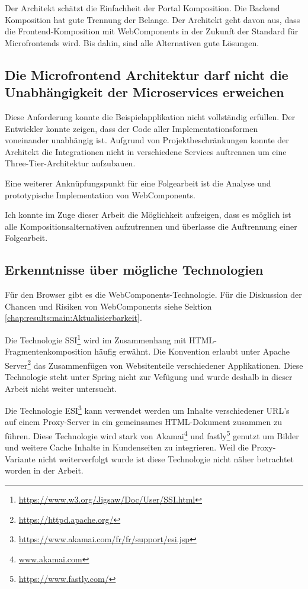 Der Architekt  schätzt die Einfachheit der Portal Komposition. Die Backend Komposition hat gute Trennung der Belange. Der Architekt geht davon aus, dass die Frontend-Komposition mit WebComponents in der Zukunft der Standard für Microfrontends wird. Bis dahin, sind alle Alternativen gute Lösungen.

\subsection{Die Microfrontend Architektur darf nicht die Unabhängigkeit der Microservices erweichen}

Diese  Anforderung konnte die Beispielapplikation nicht vollständig erfüllen. Der Entwickler konnte zeigen, dass der Code aller Implementationsformen voneinander unabhängig ist. Aufgrund von Projektbeschränkungen konnte der Architekt die Integrationen nicht in verschiedene Services auftrennen um eine Three-Tier-Architektur aufzubauen.

Eine  weiterer Anknüpfungspunkt für eine Folgearbeit ist die Analyse und prototypische Implementation von WebComponents. \cite{mdnWebComponents}

Ich  konnte im Zuge dieser Arbeit die Möglichkeit aufzeigen, dass es möglich ist alle Kompositionsalternativen aufzutrennen und überlasse die Auftrennung einer Folgearbeit.

\subsection{Erkenntnisse über mögliche Technologien}

Für den Browser gibt es die  WebComponents-Technologie. \cite{mdnWebComponents} Für die Diskussion der Chancen und Risiken von WebComponents siehe Sektion \ref{chap:results:main:Aktualisierbarkeit}.

Die Technologie  \ac{SSI}\footnote{\url{https://www.w3.org/Jigsaw/Doc/User/SSI.html}} wird im Zusammenhang mit \ac{HTML}-Fragmentenkomposition häufig erwähnt. Die Konvention erlaubt unter Apache Server\footnote{\url{https://httpd.apache.org/}} das Zusammenfügen von Websitenteile verschiedener Applikationen. Diese Technologie steht unter Spring nicht zur Vefügung und wurde deshalb in dieser Arbeit nicht weiter untersucht.

Die Technologie  \ac{ESI}\footnote{\url{https://www.akamai.com/fr/fr/support/esi.jsp}} kann verwendet werden um Inhalte verschiedener URL's auf einem Proxy-Server in ein gemeinsames \ac{HTML}-Dokument zusammen zu führen. Diese Technologie wird stark von Akamai\footnote{\url{www.akamai.com}} und fastly\footnote{\url{https://www.fastly.com/}} genutzt um Bilder und weitere Cache Inhalte in Kundenseiten zu integrieren.\cite{FastlyESI} Weil die Proxy-Variante nicht weiterverfolgt wurde ist diese Technologie nicht näher betrachtet worden in der Arbeit.